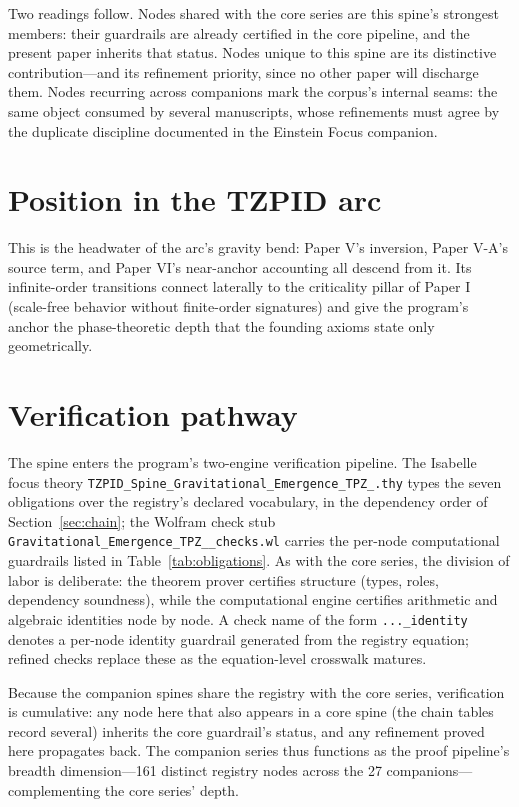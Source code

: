 \documentclass[11pt]{article}
\theoremstyle{remark}
\begin{document}
Two readings follow. Nodes shared with the core series are this spine's strongest members: their guardrails are already certified in the core pipeline, and the present paper inherits that status. Nodes unique to this spine are its distinctive contribution---and its refinement priority, since no other paper will discharge them. Nodes recurring across companions mark the corpus's internal seams: the same object consumed by several manuscripts, whose refinements must agree by the duplicate discipline documented in the Einstein Focus companion.

\section{Position in the TZPID arc}
\label{sec:arc}

This is the headwater of the arc's gravity bend: Paper V's inversion, Paper V-A's source term, and Paper VI's near-anchor accounting all descend from it. Its infinite-order transitions connect laterally to the criticality pillar of Paper I (scale-free behavior without finite-order signatures) and give the program's anchor the phase-theoretic depth that the founding axioms state only geometrically.

\section{Verification pathway}
\label{sec:verify}

The spine enters the program's two-engine verification pipeline. The Isabelle focus theory \texttt{TZPID\_Spine\_Gravitational\_Emergence\_TPZ\_.thy} types the seven obligations over the registry's declared vocabulary, in the dependency order of Section~\ref{sec:chain}; the Wolfram check stub \texttt{Gravitational\_Emergence\_TPZ\_\_checks.wl} carries the per-node computational guardrails listed in Table~\ref{tab:obligations}. As with the core series, the division of labor is deliberate: the theorem prover certifies structure (types, roles, dependency soundness), while the computational engine certifies arithmetic and algebraic identities node by node. A check name of the form \texttt{...\_identity} denotes a per-node identity guardrail generated from the registry equation; refined checks replace these as the equation-level crosswalk matures.

Because the companion spines share the registry with the core series, verification is cumulative: any node here that also appears in a core spine (the chain tables record several) inherits the core guardrail's status, and any refinement proved here propagates back. The companion series thus functions as the proof pipeline's breadth dimension---161 distinct registry nodes across the 27 companions---complementing the core series' depth.
\end{document}
